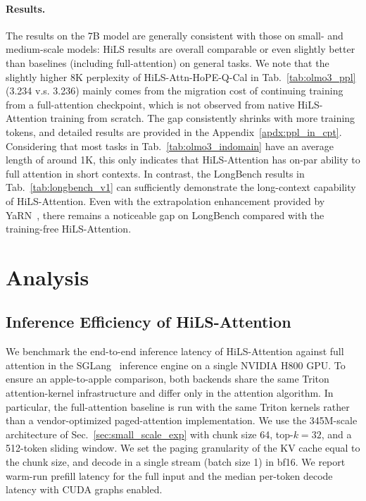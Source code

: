 



\paragraph{Results.} 
The results on the 7B model are generally consistent with those on small- and medium-scale models: HiLS results are overall comparable or even slightly better than baselines (including full-attention) on general tasks.
We note that the slightly higher 8K perplexity of HiLS-Attn-HoPE-Q-Cal in Tab.~\ref{tab:olmo3_ppl} (3.234 v.s. 3.236) mainly comes from the migration cost of continuing training from a full-attention checkpoint, which is not observed from native HiLS-Attention training from scratch. The gap consistently shrinks with more training tokens, and detailed results are provided in the Appendix~\ref{apdx:ppl_in_cpt}.
Considering that most tasks in Tab.~\ref{tab:olmo3_indomain} have an average length of around 1K, this only indicates that HiLS-Attention has on-par ability to full attention in short contexts.
In contrast, the LongBench results in Tab.~\ref{tab:longbench_v1} can sufficiently demonstrate the long-context capability of HiLS-Attention. Even with the extrapolation enhancement provided by YaRN~\cite{peng2024yarn}, there remains a noticeable gap on LongBench compared with the training-free HiLS-Attention.


\section{Analysis}

\subsection{Inference Efficiency of HiLS-Attention}
We benchmark the end-to-end inference latency of HiLS-Attention against full attention in the SGLang~\cite{zheng2024sglangefficientexecutionstructured} inference engine on a single NVIDIA H800 GPU. %
To ensure an apple-to-apple comparison, both backends share the same Triton attention-kernel infrastructure and differ only in the attention algorithm. In particular,  the full-attention baseline is run with the same Triton kernels rather than a vendor-optimized paged-attention implementation. We use the 345M-scale architecture of Sec.~\ref{sec:small_scale_exp} with chunk size 64, top-$k=32$, and a 512-token sliding window. We set the paging granularity of the KV cache equal to the chunk size, and decode in a single stream (batch size 1) in bf16. We report warm-run prefill latency for the full input and the median per-token decode latency with CUDA graphs enabled.


